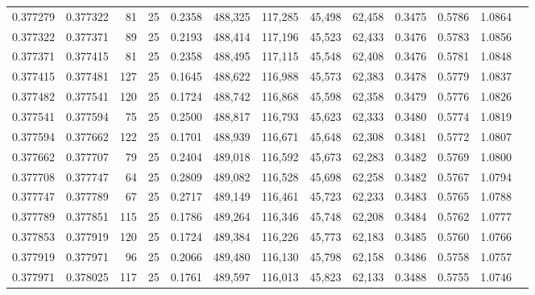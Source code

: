 \begin{tabular}{rrrrrrrrrrrrr}
0.377279 & 0.377322 &    81 &  25 &                                     0.2358 & 488,325 & 117,285 &  45,498 &  62,458 & 0.3475 & 0.5786 & 1.0864 \\
0.377322 & 0.377371 &    89 &  25 &                                     0.2193 & 488,414 & 117,196 &  45,523 &  62,433 & 0.3476 & 0.5783 & 1.0856 \\
0.377371 & 0.377415 &    81 &  25 &                                     0.2358 & 488,495 & 117,115 &  45,548 &  62,408 & 0.3476 & 0.5781 & 1.0848 \\
0.377415 & 0.377481 &   127 &  25 &                                     0.1645 & 488,622 & 116,988 &  45,573 &  62,383 & 0.3478 & 0.5779 & 1.0837 \\
0.377482 & 0.377541 &   120 &  25 &                                     0.1724 & 488,742 & 116,868 &  45,598 &  62,358 & 0.3479 & 0.5776 & 1.0826 \\
0.377541 & 0.377594 &    75 &  25 &                                     0.2500 & 488,817 & 116,793 &  45,623 &  62,333 & 0.3480 & 0.5774 & 1.0819 \\
0.377594 & 0.377662 &   122 &  25 &                                     0.1701 & 488,939 & 116,671 &  45,648 &  62,308 & 0.3481 & 0.5772 & 1.0807 \\
0.377662 & 0.377707 &    79 &  25 &                                     0.2404 & 489,018 & 116,592 &  45,673 &  62,283 & 0.3482 & 0.5769 & 1.0800 \\
0.377708 & 0.377747 &    64 &  25 &                                     0.2809 & 489,082 & 116,528 &  45,698 &  62,258 & 0.3482 & 0.5767 & 1.0794 \\
0.377747 & 0.377789 &    67 &  25 &                                     0.2717 & 489,149 & 116,461 &  45,723 &  62,233 & 0.3483 & 0.5765 & 1.0788 \\
0.377789 & 0.377851 &   115 &  25 &                                     0.1786 & 489,264 & 116,346 &  45,748 &  62,208 & 0.3484 & 0.5762 & 1.0777 \\
0.377853 & 0.377919 &   120 &  25 &                                     0.1724 & 489,384 & 116,226 &  45,773 &  62,183 & 0.3485 & 0.5760 & 1.0766 \\
0.377919 & 0.377971 &    96 &  25 &                                     0.2066 & 489,480 & 116,130 &  45,798 &  62,158 & 0.3486 & 0.5758 & 1.0757 \\
0.377971 & 0.378025 &   117 &  25 &                                     0.1761 & 489,597 & 116,013 &  45,823 &  62,133 & 0.3488 & 0.5755 & 1.0746 \\

\end{tabular}
